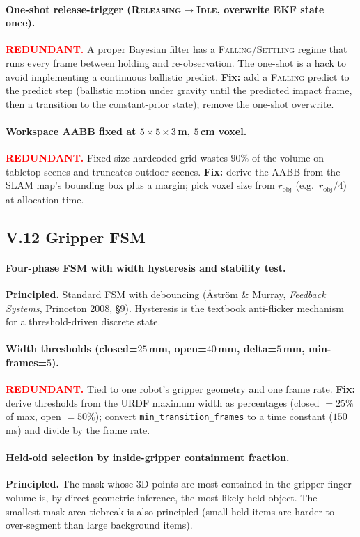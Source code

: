 \documentclass[11pt]{article}
\newcommand{\REDUNDANT}{\textcolor{red}{\textbf{REDUNDANT.}}}
\newcommand{\PRINCIPLED}{\textbf{Principled.}}
\begin{document}
\paragraph{One-shot release-trigger
(\textsc{Releasing}$\to$\textsc{Idle}, overwrite EKF state once).}
\REDUNDANT{} A proper Bayesian filter has a
\textsc{Falling}/\textsc{Settling} regime that runs every frame
between holding and re-observation. The one-shot is a hack to avoid
implementing a continuous ballistic predict.
\textbf{Fix:} add a \textsc{Falling} predict to the predict step
(ballistic motion under gravity until the predicted impact frame, then
a transition to the constant-prior state); remove the one-shot
overwrite.

\paragraph{Workspace AABB fixed at $5\times 5\times 3$\,m, $5$\,cm voxel.}
\REDUNDANT{} Fixed-size hardcoded grid wastes $90\%$ of the volume on
tabletop scenes and truncates outdoor scenes.
\textbf{Fix:} derive the AABB from the SLAM map's bounding box plus a
margin; pick voxel size from $r_{\text{obj}}$ (e.g.~$r_{\text{obj}}/4$)
at allocation time.

\subsection*{V.12 Gripper FSM}

\paragraph{Four-phase FSM with width hysteresis and stability test.}
\PRINCIPLED{} Standard FSM with debouncing
(\AA str\"om \& Murray, \emph{Feedback Systems}, Princeton 2008,
\S 9). Hysteresis is the textbook anti-flicker mechanism for a
threshold-driven discrete state.

\paragraph{Width thresholds (closed=$25$\,mm, open=$40$\,mm,
delta=$5$\,mm, min-frames=$5$).}
\REDUNDANT{} Tied to one robot's gripper geometry and one frame rate.
\textbf{Fix:} derive thresholds from the URDF maximum width as
percentages (closed $=25\%$ of max, open $=50\%$); convert
\texttt{min\_transition\_frames} to a time constant ($150$\,ms) and
divide by the frame rate.

\paragraph{Held-oid selection by inside-gripper containment fraction.}
\PRINCIPLED{} The mask whose 3D points are most-contained in the
gripper finger volume is, by direct geometric inference, the most
likely held object. The smallest-mask-area tiebreak is also
principled (small held items are harder to over-segment than large
background items).
\end{document}
